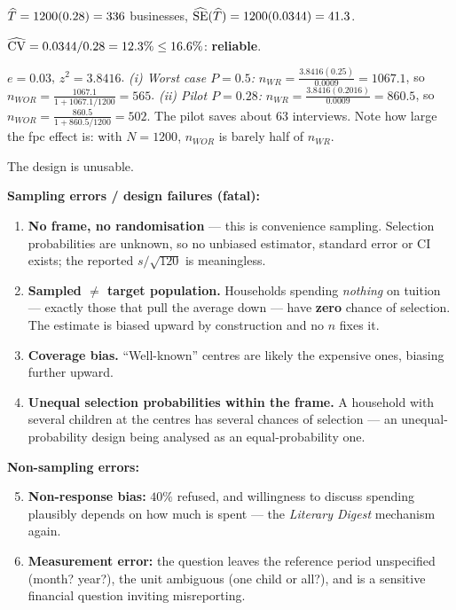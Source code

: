  $\widehat{T}=1200(0.28)=336$ businesses, $\widehat{\operatorname{SE}}(\widehat{T})=1200(0.0344)=41.3$.

 $\widehat{\operatorname{CV}}=0.0344/0.28=12.3\%\le16.6\%$: \textbf{reliable}.

 $e=0.03$, $z^2=3.8416$.
\emph{(i) Worst case $P=0.5$:} $n_{WR}=\frac{3.8416(0.25)}{0.0009}=1067.1$, so
$n_{WOR}=\frac{1067.1}{1+1067.1/1200}=\boxed{565}$.
\emph{(ii) Pilot $P=0.28$:} $n_{WR}=\frac{3.8416(0.2016)}{0.0009}=860.5$, so
$n_{WOR}=\frac{860.5}{1+860.5/1200}=\boxed{502}$.
The pilot saves about $63$ interviews. Note how large the fpc effect is: with $N=1200$,
$n_{WOR}$ is barely half of $n_{WR}$.

\sol The design is unusable.

\textbf{Sampling errors / design failures (fatal):}
\begin{enumerate}
  \item \textbf{No frame, no randomisation} --- this is convenience sampling. Selection
        probabilities are unknown, so no unbiased estimator, standard error or CI exists; the
        reported $s/\sqrt{120}$ is meaningless.
  \item \textbf{Sampled $\ne$ target population.} Households spending \emph{nothing} on tuition ---
        exactly those that pull the average down --- have \textbf{zero} chance of selection. The
        estimate is biased upward by construction and no $n$ fixes it.
  \item \textbf{Coverage bias.} ``Well-known'' centres are likely the expensive ones, biasing
        further upward.
  \item \textbf{Unequal selection probabilities within the frame.} A household with several
        children at the centres has several chances of selection --- an unequal-probability design
        being analysed as an equal-probability one.
\end{enumerate}

\textbf{Non-sampling errors:}
\begin{enumerate}\setcounter{enumi}{4}
  \item \textbf{Non-response bias:} $40\%$ refused, and willingness to discuss spending plausibly
        depends on how much is spent --- the \emph{Literary Digest} mechanism again.
  \item \textbf{Measurement error:} the question leaves the reference period unspecified (month?
        year?), the unit ambiguous (one child or all?), and is a sensitive financial question
        inviting misreporting.
\end{enumerate}

